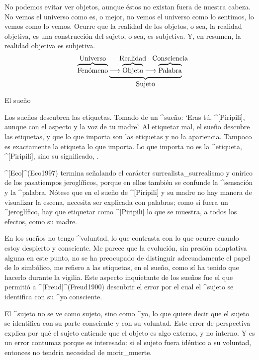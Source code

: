 No podemos evitar ver objetos, aunque éstos no existan fuera de nuestra
cabeza. No vemos el universo como es, o mejor, no vemos el universo como
lo sentimos, lo vemos como lo vemos. Ocurre que la realidad de los
objetos, o sea, la realidad objetiva, es una construcción del sujeto, o
sea, es subjetiva. Y, en resumen, la realidad objetiva es subjetiva.
{\abovedisplayshortskip=12pt
$$\overbrace{\hbox{\strut Fenómeno}}^{\hbox{Universo}}
 \underbrace{\longrightarrow
  \overbrace{\hbox{\strut Objeto}}^{\hbox to0pt{\hss Realidad\hss}}
  \longrightarrow
  \overbrace{\hbox{\strut Palabra}}^{\hbox to 0pt{\hss
   Consciencia\hss}}}_{\hbox{Sujeto}}$$
}


\Section El sueño

Los sueños descubren las etiquetas. Tomado de un ^{sueño}: `Eras tú,
^[Piripili], aunque con el aspecto y la voz de tu madre'. Al etiquetar
mal, el sueño descubre las etiquetas, y que lo que importa son las
etiquetas y no la apariencia. Tampoco es exactamente la etiqueta lo que
importa. Lo que importa no es la ^{etiqueta}, ^[Piripili], sino su
significado, .

^[Eco]^(Eco1997) termina señalando el carácter surrealista_{surrealismo}
y onírico de los pasatiempos jeroglíficos, porque en ellos también se
confunde la ^{sensación} y la ^{palabra}. Nótese que en el sueño de
^[Piripili] y su madre no hay manera de visualizar la escena, necesita
ser explicada con palabras; como si fuera un ^{jeroglífico}, hay que
etiquetar como ^[Piripili] lo que se muestra, a todos los efectos, como
su madre.

En los sueños no tengo ^{voluntad}, lo que contrasta con lo que ocurre
cuando estoy despierto y consciente. Me parece que la evolución, sin
presión adaptativa alguna en este punto, no se ha preocupado de
distinguir adecuadamente el papel de lo simbólico, me refiero a las
etiquetas, en el sueño, como sí ha tenido que hacerlo durante la
vigilia. Este aspecto inquietante de los sueños fue el que permitió a
^[Freud]^(Freud1900) descubrir el error por el cual el ^{sujeto} se
identifica con su ^{yo} consciente.

El ^{sujeto} no se ve como sujeto, sino como ^{yo}, lo que quiere decir
que el sujeto se identifica con su parte consciente y con su voluntad.
Este error de perspectiva explica por qué el sujeto entiende que el
objeto es algo externo, y no interno. Y es un error contumaz porque es
interesado: si el sujeto fuera idéntico a su voluntad, entonces no
tendría necesidad de morir_{muerte}.


